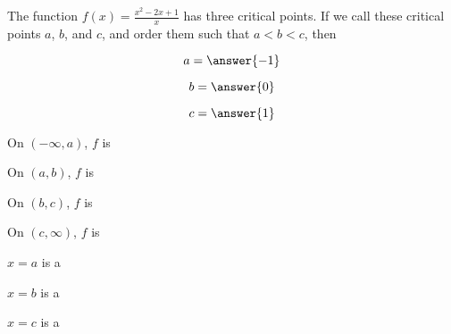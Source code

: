 \documentclass{ximera}
\author{Steven Gubkin}
\begin{document}
\begin{exercise}

The function $f(x) =\frac{x^2-2x+1}{x}$ has three critical
points.  If we call these critical points $a$, $b$, and $c$, and order them
such that $a < b < c$, then

$$
a = \answer{-1}
$$

$$
b=\answer{0}
$$

$$
c=\answer{1}
$$

On $(-\infty,a)$, $f$ is 

On $(a,b)$, $f$ is 

On $(b,c)$, $f$ is 

On $(c,\infty)$, $f$ is 


$x=a$ is a 

$x=b$ is a 

$x=c$ is a 

\end{exercise}
\end{document}
